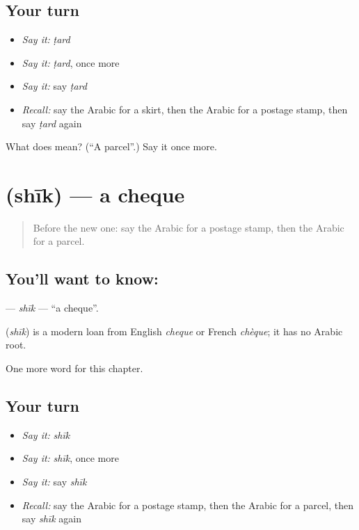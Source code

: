 \subsection*{Your turn}
\begin{itemize}
\raggedright
  \item \emph{Say it:} \emph{ṭard}
  \item \emph{Say it:} \emph{ṭard}, once more
  \item \emph{Say it:} say \emph{ṭard}
  \item \emph{Recall:} say the Arabic for a skirt, then the Arabic for a postage stamp, then say \emph{ṭard} again
\end{itemize}

\begin{tcolorbox}[breakable,colback=teal!4,colframe=teal!35!black,title={Before you move on}]
What does  mean? (\textquotedblleft{}A parcel\textquotedblright{}.) Say it once more.
\end{tcolorbox}
\section[\texorpdfstring{\ar{شيك} (shīk)}{شيك (shīk)}]{ (shīk) — a cheque}

\label{lesson:AR-C183-shik}



\begin{quote}
Before the new one: say the Arabic for a postage stamp, then the Arabic for a parcel.
\end{quote}

\subsection*{You'll want to know: }
\textbf{} — \emph{shīk} — \textquotedblleft{}a cheque\textquotedblright{}.

\begin{cousinweb}
\textbf{} (\emph{shīk}) is a modern loan from English \emph{cheque} or French \emph{chèque}; it has no Arabic root.
\end{cousinweb}

\begin{grammarlens}[title={What you've built}]
One more word for this chapter.
\end{grammarlens}

\subsection*{Your turn}
\begin{itemize}
\raggedright
  \item \emph{Say it:} \emph{shīk}
  \item \emph{Say it:} \emph{shīk}, once more
  \item \emph{Say it:} say \emph{shīk}
  \item \emph{Recall:} say the Arabic for a postage stamp, then the Arabic for a parcel, then say \emph{shīk} again
\end{itemize}

